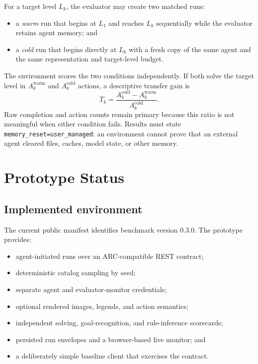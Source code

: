 \documentclass[sigconf,nonacm]{acmart}
\begin{document}
For a target level \(L_k\), the evaluator may create two matched runs:

\begin{itemize}
  \item a \emph{warm} run that begins at \(L_1\) and reaches \(L_k\)
  sequentially while the evaluator retains agent memory; and
  \item a \emph{cold} run that begins directly at \(L_k\) with a fresh copy of
  the same agent and the same representation and target-level budget.
\end{itemize}

The environment scores the two conditions independently. If both solve the
target level in \(A_k^{\mathrm{warm}}\) and \(A_k^{\mathrm{cold}}\) actions, a
descriptive transfer gain is
\[
T_k=
\frac{A_k^{\mathrm{cold}}-A_k^{\mathrm{warm}}}
     {A_k^{\mathrm{cold}}}.
\]
Raw completion and action counts remain primary because this ratio is not
meaningful when either condition fails. Results must state
\texttt{memory\_reset=user\_managed}: an environment cannot prove that an
external agent cleared files, caches, model state, or other memory.

\section{Prototype Status}

\subsection{Implemented environment}

The current public manifest identifies benchmark version 0.3.0. The prototype
provides:

\begin{itemize}
  \item agent-initiated runs over an ARC-compatible REST contract;
  \item deterministic catalog sampling by seed;
  \item separate agent and evaluator-monitor credentials;
  \item optional rendered images, legends, and action semantics;
  \item independent solving, goal-recognition, and rule-inference scorecards;
  \item persisted run envelopes and a browser-based live monitor; and
  \item a deliberately simple baseline client that exercises the contract.
\end{itemize}
\end{document}
